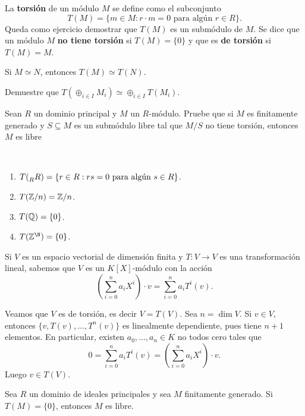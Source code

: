 La \textbf{torsión} de un módulo $M$ se define como
el subconjunto 
\[
T(M)=\{m\in M:r\cdot m=0\text{ para algún $r\in R$}\}.
\]
Queda como ejercicio demostrar que $T(M)$ es un submódulo de $M$. 
Se dice que un módulo $M$ 
\textbf{no tiene torsión} si $T(M)=\{0\}$ y que es \textbf{de torsión} si $T(M)=M$.   

\begin{exercise}
Si $M\simeq N$, entonces $T(M)\simeq T(N)$.
\end{exercise}

\begin{exercise}
Demuestre que $T(\oplus_{i\in I}M_i)\simeq \oplus_{i\in I}T(M_i)$.
\end{exercise}

\begin{exercise}
\label{xca:free}
    Sean $R$ un dominio principal y $M$ un $R$-módulo. Pruebe que si $M$ es
    finitamente generado y $S\subseteq M$ es un submódulo libre tal que $M/S$ no
    tiene torsión, entonces $M$ es libre
\end{exercise}

\begin{examples}\
\begin{enumerate}
\item $T(\prescript{}{R}R)=\{r\in R:rs=0\text{ para algún $s\in R$}\}$.
\item $T(\mathbb{Z}/n)=\mathbb{Z}/n$.
\item $T(\mathbb{Q})=\{0\}$.
\item $T(\Z^{\N})=\{0\}$. 
\end{enumerate}
\end{examples}

\begin{example}
Si $V$ es un espacio vectorial de dimensión finita y $T\colon V\to V$ es una
transformación lineal, sabemos que $V$ es un $K[X]$-módulo con la acción
\[
\left(\sum_{i=0}^n a_iX^i\right)\cdot v=\sum_{i=0}^n a_iT^i(v).
\]

Veamos que
$V$ es de torsión, es decir $V=T(V)$. Sea $n=\dim V$. Si $v\in V$, entonces 
$\{v,T(v),\dots,T^n(v)\}$ es linealmente dependiente, pues
tiene $n+1$ elementos. En particular, existen $a_0,\dots,a_n\in K$ no todos cero tales
que 
\[
0=\sum_{i=0}^n a_iT^i(v)=\left(\sum_{i=0}^n a_iX^i\right)\cdot v.
\]
Luego $v\in T(V)$. 
\end{example}

\begin{theorem}
Sea $R$ un dominio de ideales principales  
y sea $M$ finitamente generado. Si $T(M)=\{0\}$, entonces $M$ es libre. 
\end{theorem}

